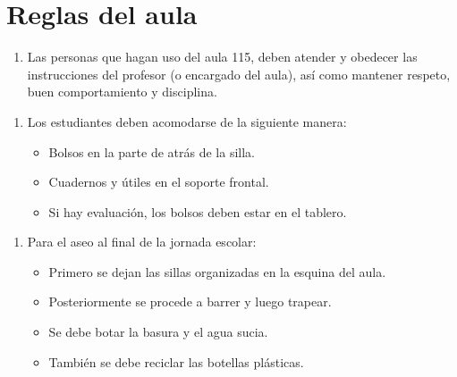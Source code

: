 \documentclass[letterpaper,10pt,spanish]{sphinxmanual}
\begin{document}
\sphinxstepscope


\chapter{Reglas del aula}
\label{\detokenize{reglas:reglas-del-aula}}\label{\detokenize{reglas::doc}}\begin{enumerate}
%
\item {} 
\sphinxAtStartPar
Las personas que hagan uso del aula 115, deben atender y obedecer las instrucciones del profesor (o encargado del aula), así como mantener respeto, buen comportamiento y disciplina.

\end{enumerate}
\begin{enumerate}
%
\setcounter{enumi}{1}
\item {} 
\sphinxAtStartPar
Los estudiantes deben acomodarse de la siguiente manera:
\begin{itemize}
\item {} 
\sphinxAtStartPar
Bolsos en la parte de atrás de la silla.

\item {} 
\sphinxAtStartPar
Cuadernos y útiles en el soporte frontal.

\item {} 
\sphinxAtStartPar
Si hay evaluación, los bolsos deben estar en el tablero.

\end{itemize}

\end{enumerate}
\begin{enumerate}
%
\setcounter{enumi}{2}
\item {} 
\sphinxAtStartPar
Para el aseo al final de la jornada escolar:
\begin{itemize}
\item {} 
\sphinxAtStartPar
Primero se dejan las sillas organizadas en la esquina del aula.

\item {} 
\sphinxAtStartPar
Posteriormente se procede a barrer y luego trapear.

\item {} 
\sphinxAtStartPar
Se debe botar la basura y el agua sucia.

\item {} 
\sphinxAtStartPar
También se debe reciclar las botellas plásticas.

\end{itemize}

\end{enumerate}
\end{document}
